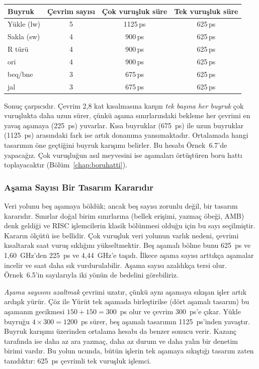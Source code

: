 \begin{ornek}
\begin{center}
\small
\begin{tabular}{@{}lccc@{}}
\toprule
\textbf{Buyruk} & \textbf{Çevrim sayısı} & \textbf{Çok vuruşluk süre} & \textbf{Tek vuruşluk süre} \\
\midrule
Yükle (lw) & 5 & 1125\,ps & 625\,ps \\
Sakla (sw) & 4 & 900\,ps & 625\,ps \\
R türü & 4 & 900\,ps & 625\,ps \\
ori & 4 & 900\,ps & 625\,ps \\
beq/bne & 3 & 675\,ps & 625\,ps \\
jal & 3 & 675\,ps & 625\,ps \\
\bottomrule
\end{tabular}
\end{center}

Sonuç çarpıcıdır. Çevrim 2{,}8 kat kısalmasına karşın \emph{tek başına her buyruk} çok vuruşlukta daha uzun sürer, çünkü aşama sınırlarındaki bekleme her çevrimi en yavaş aşamaya (225~ps) yuvarlar. Kısa buyruklar (675~ps) ile uzun buyruklar (1125~ps) arasındaki fark ise artık donanıma yansımaktadır. Ortalamada hangi tasarımın öne geçtiğini buyruk karışımı belirler. Bu hesabı Örnek~6.7'de yapacağız. Çok vuruşluğun asıl meyvesini ise aşamaları örtüştüren boru hattı toplayacaktır (Bölüm~\ref{chap:boruhatti}).
\end{ornek}

\subsubsection{Aşama Sayısı Bir Tasarım Kararıdır}

Veri yolunu beş aşamaya böldük; ancak beş sayısı zorunlu değil, bir tasarım kararıdır. Sınırlar doğal birim sınırlarına (bellek erişimi, yazmaç öbeği, AMB) denk geldiği ve RISC işlemcilerin klasik bölünmesi olduğu için bu sayı seçilmiştir. Kararın ölçütü ise bellidir. Çok vuruşluk veri yolunun varlık nedeni, çevrimi kısaltarak saat vuruş sıklığını yükseltmektir. Beş aşamalı bölme bunu 625~ps ve 1{,}60~GHz'den 225~ps ve 4{,}44~GHz'e taşıdı. İlkece aşama sayısı arttıkça aşamalar incelir ve saat daha sık vurdurulabilir. Aşama sayısı azaldıkça tersi olur. Örnek~6.5'in sayılarıyla iki yönün de bedelini görebiliriz.

\emph{Aşama sayısını azaltmak} çevrimi uzatır, çünkü aynı aşamaya sıkışan işler artık ardışık yürür. Çöz ile Yürüt tek aşamada birleştirilse (dört aşamalı tasarım) bu aşamanın gecikmesi $150 + 150 = 300$~ps olur ve çevrim 300~ps'e çıkar. Yükle buyruğu $4 \times 300 = 1200$~ps sürer, beş aşamalı tasarımın 1125~ps'inden yavaştır. Buyruk karışımı üzerinden ortalama hesabı da benzer sonucu verir. Kazanç tarafında ise daha az ara yazmaç, daha az durum ve daha yalın bir denetim birimi vardır. Bu yolun ucunda, bütün işlerin tek aşamaya sıkıştığı tasarım zaten tanıdıktır: 625~ps çevrimli tek vuruşluk işlemci.

